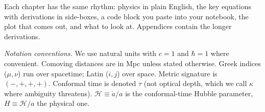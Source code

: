 Each chapter has the same rhythm: physics in plain English, the key equations with derivations in side-boxes, a code block you paste into your notebook, the plot that comes out, and what to look at. Appendices contain the longer derivations.

\noindent\hrulefill

\noindent\textit{Notation conventions.} We use natural units with $c = 1$ and $\hbar = 1$ where convenient. Comoving distances are in Mpc unless stated otherwise. Greek indices ($\mu,\nu$) run over spacetime; Latin ($i,j$) over space. Metric signature is $(-,+,+,+)$. Conformal time is denoted $\tau$ (not optical depth, which we call $\kappa$ where ambiguity threatens). $\mathcal{H} \equiv \dot a / a$ is the conformal-time Hubble parameter, $H \equiv \mathcal{H}/a$ the physical one.

